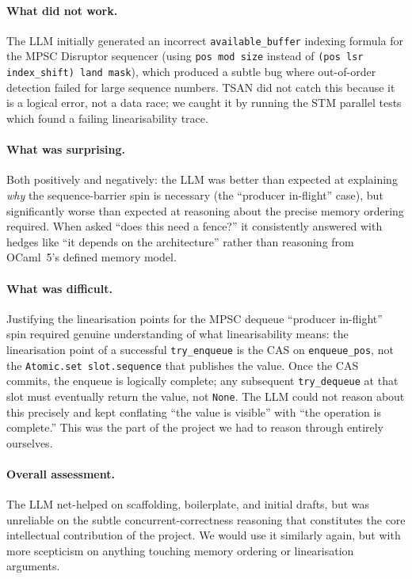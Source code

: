 \documentclass[11pt,a4paper]{article}
\begin{document}
\paragraph{What did not work.}
The LLM initially generated an incorrect \texttt{available\_buffer} indexing formula
for the MPSC Disruptor sequencer (using \texttt{pos mod size} instead of
\texttt{(pos lsr index\_shift) land mask}), which produced a subtle bug where
out-of-order detection failed for large sequence numbers. TSAN did not catch this
because it is a logical error, not a data race; we caught it by running the STM
parallel tests which found a failing linearisability trace.

\paragraph{What was surprising.}
Both positively and negatively: the LLM was better than expected at explaining
\emph{why} the sequence-barrier spin is necessary (the ``producer in-flight'' case),
but significantly worse than expected at reasoning about the precise memory ordering
required. When asked ``does this need a fence?'' it consistently answered with
hedges like ``it depends on the architecture'' rather than reasoning from OCaml~5's
defined memory model.

\paragraph{What was difficult.}
Justifying the linearisation points for the MPSC dequeue ``producer in-flight'' spin
required genuine understanding of what linearisability means: the linearisation point
of a successful \texttt{try\_enqueue} is the CAS on \texttt{enqueue\_pos}, not the
\texttt{Atomic.set slot.sequence} that publishes the value. Once the CAS commits,
the enqueue is logically complete; any subsequent \texttt{try\_dequeue} at that slot
must eventually return the value, not \texttt{None}. The LLM could not reason about
this precisely and kept conflating ``the value is visible'' with ``the operation is
complete.'' This was the part of the project we had to reason through entirely ourselves.

\paragraph{Overall assessment.}
The LLM net-helped on scaffolding, boilerplate, and initial drafts, but was unreliable
on the subtle concurrent-correctness reasoning that constitutes the core intellectual
contribution of the project. We would use it similarly again, but with more scepticism
on anything touching memory ordering or linearisation arguments.
\end{document}
